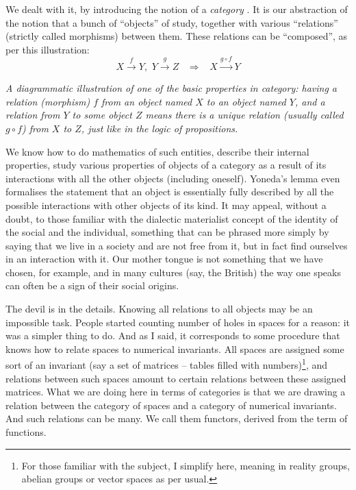 \documentclass{article}
\begin{document}
We dealt with it, by introducing the notion of a \emph{category} \cite{EILMAC,MACLANE}. It is our abstraction of the notion that a bunch of “objects” of study, together with various “relations” (strictly called morphisms) between them. These relations can be ``composed'', as per this illustration:
$$
X \stackrel f \longrightarrow Y, \, \, Y \stackrel g \longrightarrow Z \, \, \, \, \, \Rightarrow \, \, \, \, \, X \stackrel{g \circ f}{\longrightarrow} Y
$$
\begin{center}
\textit{A diagrammatic illustration of one of the basic properties in category: having a relation (morphism) $f$ from an object named $X$ to an object named $Y$, and a relation from $Y$ to some object $Z$ means there is a unique relation (usually called $g \circ f$) from $X$ to $Z$, just like in the logic of propositions.}
\end{center}

We know how to do mathematics of such entities, describe their internal properties, study various properties of objects of a category as a result of its interactions with all the other objects (including oneself).
Yoneda’s lemma \cite{MACLANE} even formalises the statement that an object is essentially fully described by all the possible interactions with other objects of its kind. It may appeal, without a doubt, to those familiar with the dialectic materialist concept of the identity of the social and the individual, something that can be phrased more simply by saying that we live in a society and are not free from it, but in fact find ourselves in an interaction with it. Our mother tongue is not something that we have chosen, for example, and in many cultures (say, the British) the way one speaks can often be a sign of their social origins.

The devil is in the details. Knowing all relations to all objects may be an impossible task. People started counting number of holes in spaces for a reason: it was a simpler thing to do. And as I said, it corresponds to some procedure that knows how to relate spaces to numerical invariants. All spaces are assigned some sort of an invariant (say a set of matrices – tables filled with numbers)\footnote{For those familiar with the subject, I simplify here, meaning in reality groups, abelian groups or vector spaces as per usual.}, and relations between such spaces amount to certain relations between these assigned matrices. What we are doing here in terms of categories is that we are drawing a relation between the category of spaces and a category of numerical invariants. And such relations can be many. We call them functors, derived from the term of functions.
\end{document}
